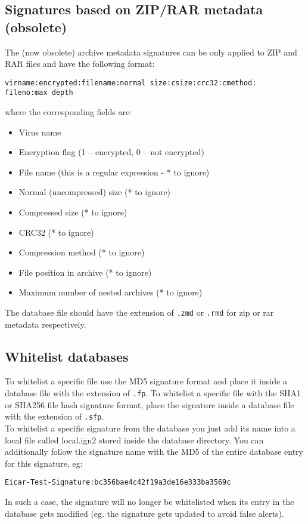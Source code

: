\documentclass[a4paper,titlepage,12pt]{article}
\begin{document}
    \subsection{Signatures based on ZIP/RAR metadata (obsolete)}
    The (now obsolete) archive metadata signatures can be only applied
    to ZIP and RAR files and have the following format:
\begin{verbatim}
virname:encrypted:filename:normal size:csize:crc32:cmethod:
fileno:max depth
\end{verbatim}
    where the corresponding fields are:
    \begin{itemize}
	\item Virus name
	\item Encryption flag (1 -- encrypted, 0 -- not encrypted)
	\item File name (this is a regular expression - * to ignore)
	\item Normal (uncompressed) size (* to ignore)
	\item Compressed size (* to ignore)
	\item CRC32 (* to ignore)
	\item Compression method (* to ignore)
	\item File position in archive (* to ignore)
	\item Maximum number of nested archives (* to ignore)
    \end{itemize}
    The database file should have the extension of \verb+.zmd+ or
    \verb+.rmd+ for zip or rar metadata respectively.

    \subsection{Whitelist databases}
    To whitelist a specific file use the MD5 signature format and place
    it inside a database file with the extension of \verb+.fp+.
    To whitelist a specific file with the SHA1 or SHA256 file hash signature
    format, place the signature inside a database file with the extension
    of \verb+.sfp+.\\

    \noindent
    To whitelist a specific signature from the database you just add
    its name into a local file called local.ign2 stored inside the
    database directory. You can additionally follow the signature name
    with the MD5 of the entire database entry for this signature, eg:
\begin{verbatim}
Eicar-Test-Signature:bc356bae4c42f19a3de16e333ba3569c
\end{verbatim}
    In such a case, the signature will no longer be whitelisted when
    its entry in the database gets modified (eg. the signature gets
    updated to avoid false alerts).
\end{document}
